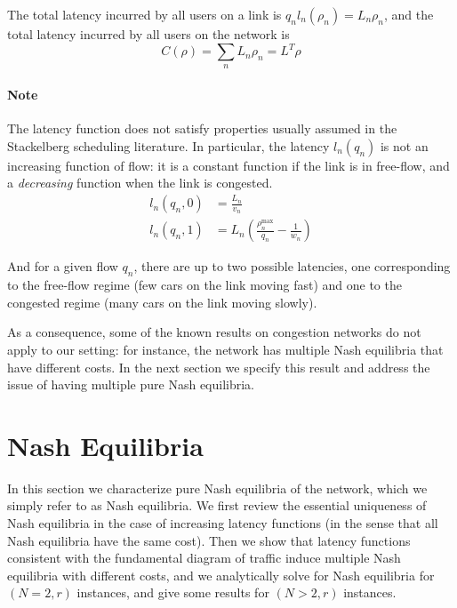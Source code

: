 The total latency incurred by all users on a link is $q_n l_n(\rho_n) = L_n \rho_n$, and the total latency incurred by all users on the network is
\begin{equation}
\label{eq:cost_function}
C(\rho) = \sum_n L_n \rho_n = L^T\rho
\end{equation}

\paragraph{Note} The latency function does not satisfy properties usually assumed in the Stackelberg scheduling literature. In particular, the latency $l_n(q_n)$ is not an increasing function of flow: it is a constant function if the link is in free-flow, and a \emph{decreasing} function when the link is congested.
\begin{align*}
l_n(q_n, 0) &= \frac{L_n}{v_n}\\
l_n(q_n, 1) &= L_n \left( \frac{\rho_n^{\max}}{q_n} - \frac{1}{w_n} \right)
\end{align*}

And for a given flow $q_n$, there are up to two possible latencies, one corresponding to the free-flow regime (few cars on the link moving fast) and one to the congested regime (many cars on the link moving slowly).

As a consequence, some of the known results on congestion networks do not apply to our setting: for instance, the network has multiple Nash equilibria that have different costs. In the next section we specify this result and address the issue of having multiple pure Nash equilibria.



\section{Nash Equilibria}
In this section we characterize pure Nash equilibria of the network, which we simply refer to as Nash equilibria. We first review the essential uniqueness of Nash equilibria in the case of increasing latency functions (in the sense that all Nash equilibria have the same cost). Then we show that latency functions consistent with the fundamental diagram of traffic induce multiple Nash equilibria with different costs, and we analytically solve for Nash equilibria for $(N = 2, r)$ instances, and give some results for $(N>2, r)$ instances.

